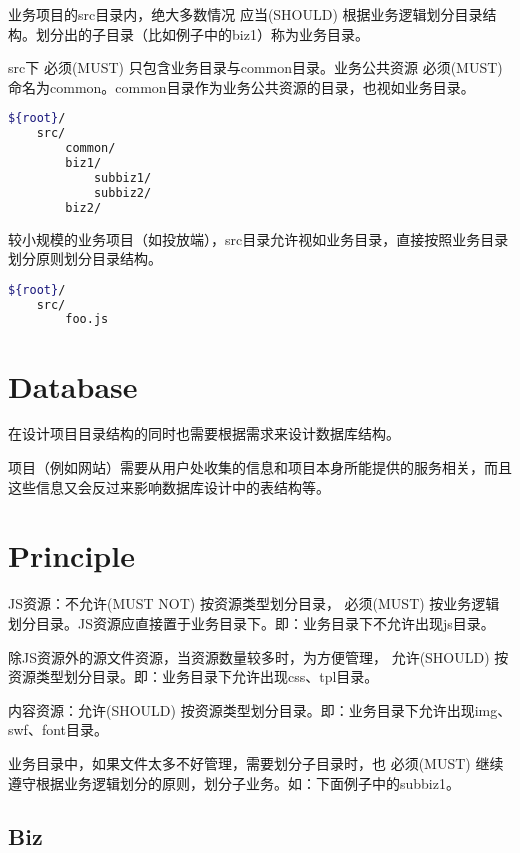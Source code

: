 业务项目的src目录内，绝大多数情况 应当(SHOULD) 根据业务逻辑划分目录结构。划分出的子目录（比如例子中的biz1）称为业务目录。


src下 必须(MUST) 只包含业务目录与common目录。业务公共资源 必须(MUST) 命名为common。common目录作为业务公共资源的目录，也视如业务目录。




\begin{lstlisting}[language=bash]
${root}/
    src/
        common/
        biz1/
            subbiz1/
            subbiz2/
        biz2/
\end{lstlisting}

较小规模的业务项目（如投放端），src目录允许视如业务目录，直接按照业务目录划分原则划分目录结构。


\begin{lstlisting}[language=bash]
${root}/
    src/
        foo.js
\end{lstlisting}


\section{Database}


在设计项目目录结构的同时也需要根据需求来设计数据库结构。

项目（例如网站）需要从用户处收集的信息和项目本身所能提供的服务相关，而且这些信息又会反过来影响数据库设计中的表结构等。




\section{Principle}

\begin{compactenum}
\item JS资源：不允许(MUST NOT) 按资源类型划分目录， 必须(MUST) 按业务逻辑划分目录。JS资源应直接置于业务目录下。即：业务目录下不允许出现js目录。
\item 除JS资源外的源文件资源，当资源数量较多时，为方便管理， 允许(SHOULD) 按资源类型划分目录。即：业务目录下允许出现css、tpl目录。
\item 内容资源：允许(SHOULD) 按资源类型划分目录。即：业务目录下允许出现img、swf、font目录。
\item 业务目录中，如果文件太多不好管理，需要划分子目录时，也 必须(MUST) 继续遵守根据业务逻辑划分的原则，划分子业务。如：下面例子中的subbiz1。
\end{compactenum}


\subsection{Biz}


